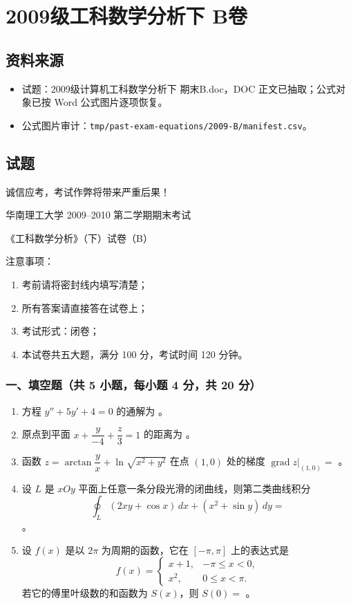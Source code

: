 \section{2009级工科数学分析下 B卷}

\subsection{资料来源}
\begin{itemize}
  \item 试题：2009级计算机工科数学分析下 期末B.doc，DOC 正文已抽取；公式对象已按 Word 公式图片逐项恢复。
  \item 公式图片审计：\texttt{tmp/past-exam-equations/2009-B/manifest.csv}。
\end{itemize}

\subsection{试题}
诚信应考，考试作弊将带来严重后果！

华南理工大学 2009--2010 第二学期期末考试

《工科数学分析》（下）试卷（B）

注意事项：
\begin{enumerate}
  \item 考前请将密封线内填写清楚；
  \item 所有答案请直接答在试卷上；
  \item 考试形式：闭卷；
  \item 本试卷共五大题，满分 100 分，考试时间 120 分钟。
\end{enumerate}

\subsubsection*{一、填空题（共 5 小题，每小题 4 分，共 20 分）}
\begin{enumerate}
  \item 方程 $y''+5y'+4=0$ 的通解为 \underline{\hspace{4cm}}。
  \item 原点到平面 $x+\dfrac{y}{-4}+\dfrac{z}{3}=1$ 的距离为 \underline{\hspace{3cm}}。
  \item 函数 $z=\arctan\dfrac{y}{x}+\ln\sqrt{x^2+y^2}$ 在点 $(1,0)$ 处的梯度 $\operatorname{grad}z\big|_{(1,0)}=$ \underline{\hspace{3cm}}。
  \item 设 $L$ 是 $xOy$ 平面上任意一条分段光滑的闭曲线，则第二类曲线积分
  \[
  \oint_L(2xy+\cos x)\,dx+(x^2+\sin y)\,dy=
  \]
  \underline{\hspace{3cm}}。
  \item 设 $f(x)$ 是以 $2\pi$ 为周期的函数，它在 $[-\pi,\pi]$ 上的表达式是
  \[
  f(x)=
  \begin{cases}
  x+1,&-\pi\le x<0,\\
  x^2,&0\le x<\pi.
  \end{cases}
  \]
  若它的傅里叶级数的和函数为 $S(x)$，则 $S(0)=$ \underline{\hspace{3cm}}。
\end{enumerate}


